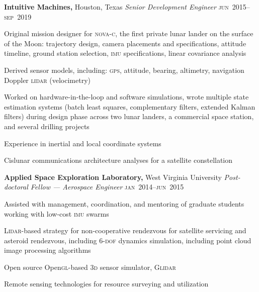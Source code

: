 \documentclass[12pt,letterpaper]{article}
\newenvironment{itemize*}%
{\begin{itemize}%
  \setlength{\itemsep}{0pt}}%
{\end{itemize}}
\newcommand{\mhead}[1]{\leavevmode\marginpar{\sffamily\footnotesize #1}}
\newcommand{\rdate}[1]{{\hfill #1}}
\begin{document}
\medskip
\textbf{Intuitive Machines,} Houston, Texas \newline
\emph{Senior Development Engineer} \rdate{\textsc{jun}~2015--\textsc{sep}~2019} %
\begin{itemize*}
  \item Original mission designer for \textsc{nova-c}, the first private lunar lander on the surface of the Moon: trajectory design, camera placements and specifications, attitude timeline, ground station selection, \textsc{imu} specifications, linear covariance analysis
  \item Derived sensor models, including: \textsc{gps}, attitude, bearing, altimetry, navigation Doppler \textsc{lidar} (velocimetry)
  \item Worked on hardware-in-the-loop and software simulations, wrote multiple state estimation systems (batch least squares, complementary filters, extended Kalman filters) during design phase across two lunar landers, a commercial space station, and several drilling projects
  \item Experience in inertial and local coordinate systems
  \item Cislunar communications architecture analyses for a satellite constellation
\end{itemize*}

\bigskip
\mhead{Academic \newline Appointments}%
\textbf{Applied Space Exploration Laboratory,} West Virginia University \newline
\emph{Post-doctoral Fellow --- Aerospace Engineer} \rdate{\textsc{jan}~2014--\textsc{jun}~2015}
\begin{itemize*}
  \item Assisted with management, coordination, and mentoring of graduate students working with low-cost \textsc{imu} swarms
  \item \textsc{Lidar}-based strategy for non-cooperative rendezvous for satellite servicing and asteroid rendezvous, including 6-\textsc{dof} dynamics simulation, including point cloud image processing algorithms
  \item Open source Open\textsc{gl}-based \textsc{3d} sensor simulator, \textsc{Glidar}
  \item Remote sensing technologies for resource surveying and utilization
\end{itemize*}
\end{document}
